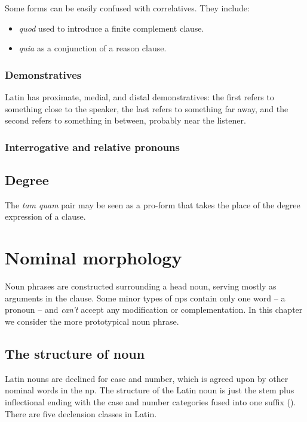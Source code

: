 \documentclass[a4paper, oneside, 12pt]{report}
\newcommand{\form}[1]{\emph{#1}}
\begin{document}
Some forms can be easily confused with correlatives.
They include:
\begin{itemize}
    \item \form{quod} used to introduce a finite complement clause.
    \item \form{quia} as a conjunction of a reason clause.
\end{itemize}

\subsection{Demonstratives}

Latin has proximate, medial, and distal demonstratives:
the first refers to something close to the speaker, 
the last refers to something far away,
and the second refers to something in between,
probably near the listener.

\subsection{Interrogative and relative pronouns}

\section{Degree}

The \form{tam quam} pair may be seen as a pro-form that takes the place of the degree expression of a clause.

\chapter{Nominal morphology}

Noun phrases are constructed surrounding a head noun, 
serving mostly as arguments in the clause.
Some minor types of \acs{np}s contain only one word -- a pronoun --  
and \emph{can't} accept any modification or complementation.
In this chapter we consider the more prototypical noun phrase.

\section{The structure of noun}\label{sec:np.noun}

Latin nouns are declined for case and number,
which is agreed upon by other nominal words in the \acs{np}.
The structure of the Latin noun is just
the stem plus inflectional ending 
with the case and number categories fused into one suffix
().
There are five declension classes in Latin.
\end{document}
